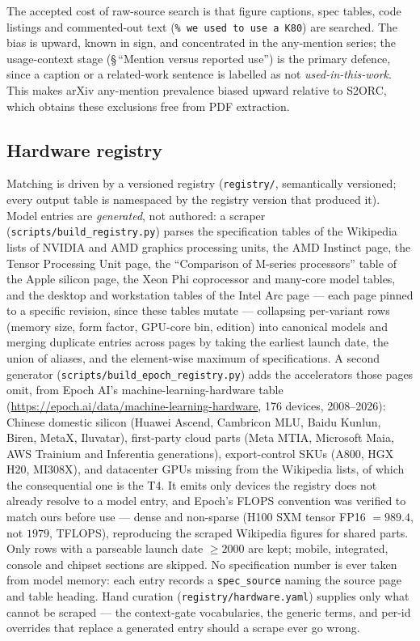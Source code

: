 The accepted cost of raw-source search is that figure captions, spec tables,
code listings and commented-out text (\verb|% we used to use a K80|) are
searched. The bias is upward, known in sign, and concentrated in the
any-mention series; the usage-context stage (\S\,``Mention versus reported use'') is the primary defence,
since a caption or a related-work sentence is labelled as not
\emph{used-in-this-work}. This makes arXiv any-mention prevalence biased upward
relative to S2ORC, which obtains these exclusions free from PDF extraction.

\subsection{Hardware registry}

Matching is driven by a versioned registry (\texttt{registry/}, semantically
versioned; every output table is namespaced by the registry version that
produced it). Model entries are \emph{generated}, not authored: a scraper
(\texttt{scripts/build\_registry.py}) parses the specification tables of the
Wikipedia lists of NVIDIA and AMD graphics processing units, the AMD Instinct
page, the Tensor Processing Unit page, the ``Comparison of M-series processors''
table of the Apple silicon page, the Xeon Phi coprocessor and many-core model
tables, and the desktop and workstation tables of the Intel Arc page --- each
page pinned to a specific revision, since these tables mutate --- collapsing
per-variant rows (memory size, form factor, GPU-core bin, edition) into canonical
models and merging duplicate entries
across pages by taking the earliest launch date, the union of aliases, and the
element-wise maximum of specifications. A second generator
(\texttt{scripts/build\_epoch\_registry.py}) adds the accelerators those pages
omit, from Epoch AI's machine-learning-hardware table
(\url{https://epoch.ai/data/machine-learning-hardware}, 176 devices, 2008--2026):
Chinese domestic silicon (Huawei Ascend, Cambricon MLU, Baidu Kunlun, Biren,
MetaX, Iluvatar), first-party cloud parts (Meta MTIA, Microsoft Maia, AWS
Trainium and Inferentia generations), export-control SKUs (A800, HGX H20,
MI308X), and datacenter GPUs missing from the Wikipedia lists, of which the
consequential one is the T4. It emits only devices the registry does not already
resolve to a model entry, and Epoch's FLOPS convention was verified to match ours
before use --- dense and non-sparse (H100 SXM tensor FP16 $=989.4$, not $1979$,
TFLOPS), reproducing the scraped Wikipedia figures for shared parts. Only rows with a parseable launch date
$\ge 2000$ are kept; mobile, integrated, console and chipset sections are
skipped. No specification number is ever taken from model memory: each entry
records a \texttt{spec\_source} naming the source page and table heading.
Hand curation (\texttt{registry/hardware.yaml}) supplies only what cannot be
scraped --- the context-gate vocabularies, the generic terms, and per-id
overrides that replace a generated entry should a scrape ever go wrong.

